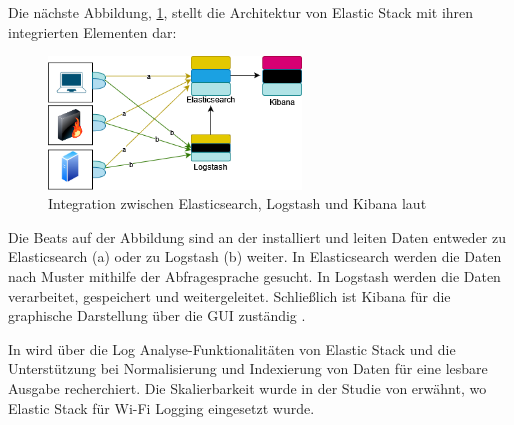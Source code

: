Die nächste Abbildung, \ref{fig:Intregation_ELK}, stellt die Architektur von Elastic Stack mit ihren integrierten Elementen dar:

\begin{figure}[H]
   \centering
   \includegraphics[width=0.6\textwidth]{assets/ElasticStack.png}
   \caption[Integration zwischen Elasticsearch, Logstash und Kibana]
   {Integration zwischen Elasticsearch, Logstash und Kibana laut \cite{packt_elkstack} }
   \label{fig:Intregation_ELK}
   \centering
\end{figure}




Die Beats auf der Abbildung sind an der  installiert und leiten Daten entweder zu Elasticsearch (a) oder zu Logstash (b) weiter. In Elasticsearch werden die Daten nach Muster mithilfe der Abfragesprache  gesucht. In Logstash werden die Daten verarbeitet, gespeichert und weitergeleitet. Schließlich ist Kibana für die graphische Darstellung über die \gls{GUI} zuständig \citep{Jain_LMELK}.


In \citep{Advani_elkstakc} wird über die Log Analyse-Funktionalitäten von Elastic Stack und die Unterstützung bei Normalisierung und Indexierung von Daten für eine lesbare Ausgabe recherchiert. Die Skalierbarkeit wurde in der Studie von \citep{Wang_elkwifi} erwähnt, wo Elastic Stack für Wi-Fi Logging eingesetzt wurde.

